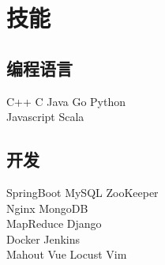 \documentclass[]{deedy-resume-openfont}
\begin{document}
\begin{minipage}[t]{0.25\textwidth}

\section{技能}
\sectionsep
\subsection{编程语言}
C++ \textbullet{} C \textbullet{} Java \textbullet{} Go \textbullet{} Python\\
Javascript \textbullet{} Scala\\ 
\sectionsep

\subsection{开发}
SpringBoot  \textbullet{} MySQL \textbullet{} ZooKeeper\\
Nginx \textbullet{} MongoDB \textbullet{} \\
MapReduce \textbullet{} Django \textbullet{} \\
Docker \textbullet{}  Jenkins \textbullet{} \\
Mahout \textbullet{} Vue \textbullet{}
Locust \textbullet{} Vim\\


%
%

\end{minipage} 
\hfill
\end{document}
